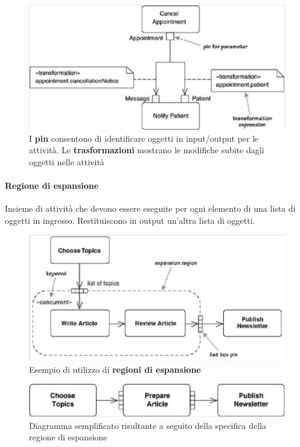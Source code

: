 \begin{figure}[h!]
    \centering
    \includegraphics[width=0.75\linewidth]{assets/UML/activity/activity-7.png}
    \caption{I \textbf{pin} consentono di identificare oggetti in input/output per le attività. Le \textbf{trasformazioni} mostrano le modifiche subite dagli oggetti nelle attività}
\end{figure}

\paragraph{Regione di espansione} Insieme di attività che devono essere eseguite per ogni elemento di una lista di oggetti in ingresso. Restituiscono in output un'altra lista di oggetti.

\begin{figure}[h!]
\centering
    \includegraphics[width=0.8\linewidth]{assets/UML/activity/activity-8.png}
    \caption{Esempio di utilizzo di \textbf{regioni di espansione}}
\end{figure}

\begin{figure}[h!]
    \centering
    \includegraphics[width=0.8\linewidth]{assets/UML/activity/activity-9.png}
    \caption{Diagramma semplificato risultante a seguito della specifica della regione di espansione}
\end{figure}

\newpage